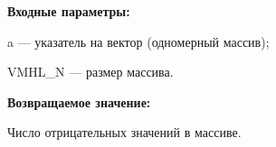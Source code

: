 \textbf{Входные параметры:}

 a --- указатель на вектор (одномерный массив);
 
 VMHL\_N --- размер массива.

\textbf{Возвращаемое значение:}

 Число отрицательных значений в массиве.